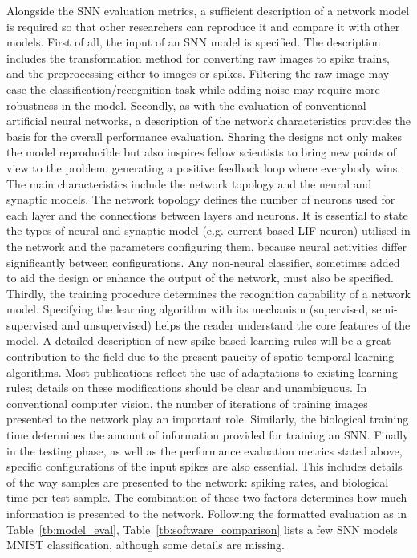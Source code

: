 Alongside the SNN evaluation metrics, a sufficient description of a network model is required so that other researchers can reproduce it and compare it with other models.
First of all, the input of an SNN model is specified.
The description includes the transformation method for converting raw images to spike trains, and the preprocessing either to images or spikes.
Filtering the raw image may ease the classification/recognition task while adding noise may require more robustness in the model.
Secondly, as with the evaluation of conventional artificial neural networks, a description of the network characteristics provides the basis for the overall performance evaluation.
Sharing the designs not only makes the model reproducible but also inspires fellow scientists to bring new points of view to the problem, generating a positive feedback loop where everybody wins.
The main characteristics include the network topology and the neural and synaptic models.
The network topology defines the number of neurons used for each layer and the connections between layers and neurons.
It is essential to state the types of neural and synaptic model (e.g. current-based LIF neuron) utilised in the network and the parameters configuring them, because neural activities differ significantly between configurations.
Any non-neural classifier, sometimes added to aid the design or enhance the output of the network, must also be specified.
Thirdly, the training procedure determines the recognition capability of a network model.
Specifying the learning algorithm with its mechanism (supervised, semi-supervised and unsupervised) helps the reader understand the core features of the model.
A detailed description of new spike-based learning rules will be a great contribution to the field due to the present paucity of spatio-temporal learning algorithms.
Most publications reflect the use of adaptations to existing learning rules; details on these modifications should be clear and unambiguous.
In conventional computer vision, the number of iterations of training images presented to the network play an important role.
Similarly, the biological training time determines the amount of information provided for training an SNN.
Finally in the testing phase, as well as the performance evaluation metrics stated above, specific configurations of the input spikes are also essential.
This includes details of the way samples are presented to the network: spiking rates, and biological time per test sample.
The combination of these two factors determines how much information is presented to the network.
Following \DIFdelbegin {}\DIFdelend the formatted evaluation as in Table~\ref{tb:model_eval}, Table~\ref{tb:software_comparison} lists a few SNN models \DIFdelbegin {}\DIFdelend \DIFaddbegin {}\DIFaddend MNIST classification, although some details are missing. 

